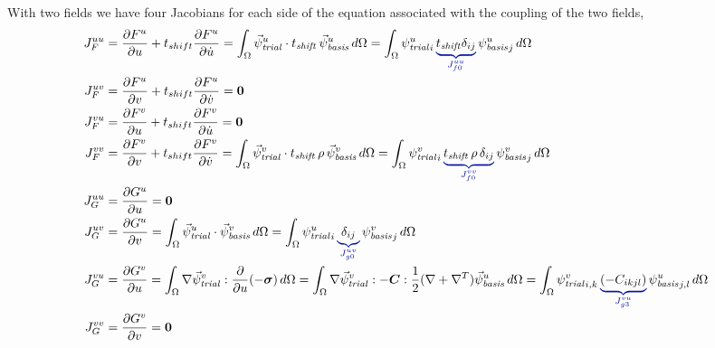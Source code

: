 With two fields we have four Jacobians for each side of the equation associated with the 
coupling of the two 
fields,
\begin{align}
  J_F^{uu} &= \frac{\partial F^u}{\partial u} + t_{shift} \frac{\partial F^u}{\partial 
\dot{u}} = \int_\Omega 
\trialvec[u] \cdot t_\mathit{shift}\,\basisvec[u] \, d\Omega = \int_\Omega \trialscalar[u]_i 
\, 
\eqnannotate{t_\mathit{shift} \delta_{ij}}{J_{f0}^{uu}} \, \basisscalar[u]_j \, d\Omega \\
  J_F^{uv} &= \frac{\partial F^u}{\partial v} + t_{shift} \frac{\partial F^u}{\partial 
\dot{v}} = \tensor{0} \\
  J_F^{vu} &= \frac{\partial F^v}{\partial u} + t_{shift} \frac{\partial F^v}{\partial 
\dot{u}} = \tensor{0} \\
  J_F^{vv} &= \frac{\partial F^v}{\partial v} + t_{shift} \frac{\partial F^v}{\partial 
\dot{v}} = \int_\Omega 
\trialvec[v] \cdot t_\mathit{shift}\,\rho\,\basisvec[v] \, d\Omega = \int_\Omega 
\trialscalar[v]_i \, 
\eqnannotate{t_\mathit{shift} \, \rho \, \delta_{ij}}{J_{f0}^{vv}} \, \basisscalar[v]_j \, 
d\Omega \\
  J_G^{uu} &= \frac{\partial G^u}{\partial u} = \tensor{0} \\
  J_G^{uv} &= \frac{\partial G^u}{\partial v} = \int_\Omega \trialvec[u] \cdot \basisvec[v] \, 
d\Omega = 
\int_\Omega \trialscalar[u]_i \, \eqnannotate{\delta_{ij}}{J_{g0}^{uv}} \, \basisscalar[v]_j 
\, d\Omega \\
  J_G^{vu} &= \frac{\partial G^v}{\partial u} = \int_\Omega \nabla \trialvec[v] : 
\frac{\partial}{\partial u}(-
\tensor{\sigma}) \, d\Omega 
  = \int_\Omega \nabla \trialvec[v] : -\tensor{C} : \frac{1}{2}(\nabla + \nabla^T)\basisvec[u] 
\, d\Omega 
  = \int_\Omega \trialscalar[v]_{i,k} \, \eqnannotate{\left( -C_{ikjl} \right)}{J_{g3}^{vu}}  
\, 
\basisscalar[u]_{j,l}\, d\Omega \\
  J_G^{vv} &= \frac{\partial G^v}{\partial v} = \tensor{0}
\end{align}

